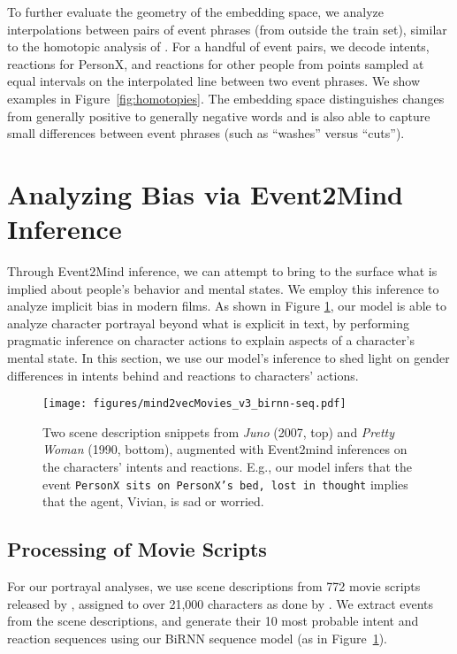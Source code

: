 \documentclass[11pt,a4paper]{article}
\begin{document}
To further evaluate the geometry of the embedding space, we analyze interpolations between pairs of event phrases (from outside the train set), similar to the homotopic analysis of \citet{Bowman2016}.  For a handful of event pairs, we decode intents, reactions for PersonX, and reactions for other people from points sampled at equal intervals on the interpolated line between two event phrases. We show examples in Figure~\ref{fig:homotopies}. The embedding space distinguishes changes from generally positive to generally negative words and is also able to capture small differences between event phrases (such as ``washes'' versus ``cuts'').







\section{Analyzing Bias via Event2Mind Inference}


Through Event2Mind inference, 
we can attempt to bring to the surface what is implied about people's behavior and mental states.
We employ this inference to analyze implicit bias in
modern films.
As shown in Figure \ref{fig:moviesQual}, our model is able to analyze character portrayal beyond what is explicit in text, by performing pragmatic inference on character actions to explain aspects of a character's mental state.
In this section, we use our model's inference to shed light on gender differences in intents behind and reactions to characters' actions. 

\begin{figure}[ht]
    \centering
    \texttt{[image: figures/mind2vecMovies\_v3\_birnn-seq.pdf]}
    \caption{
    Two scene description snippets from \textit{Juno} (2007, top) and \textit{Pretty Woman} (1990, bottom), augmented with Event2mind inferences on the characters' intents and reactions.
    E.g., our model infers that the event \texttt{PersonX sits on PersonX's bed, lost in thought} implies that the agent, Vivian, is sad or worried.}
    \label{fig:moviesQual}
\end{figure}

\subsection{Processing of Movie Scripts}
For our portrayal analyses, we use scene descriptions from 772 movie scripts released by \citet{Gorinski2015-no}, assigned to over 21,000 characters as done by \citet{Sap2017-lt}.
We extract events from the scene descriptions, and generate their 10 most probable intent and reaction sequences using our BiRNN sequence model (as in Figure~\ref{fig:moviesQual}). 
\end{document}

